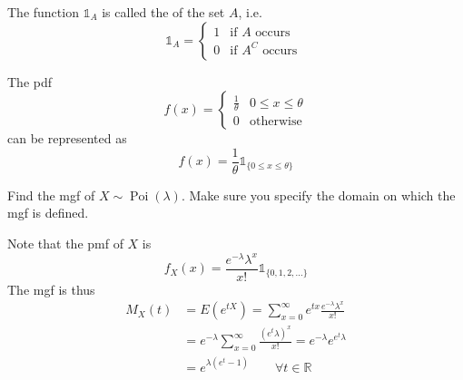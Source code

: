 \documentclass[notoc,notitlepage]{tufte-book}
\DeclareMathOperator{\Poi}{Poi }
\begin{document}
\begin{defn}
\label{defn:indicator_function}
  The function $\mathbb{1}_A$ is called the  of the set $A$, i.e.
  \begin{equation}\label{eq:indicator_function}
    \mathbb{1}_A = \begin{cases}
      1 & \text{if } A \text{ occurs } \\
      0 & \text{if } A^C \text{ occurs }
    \end{cases}
  \end{equation}
\end{defn}

\begin{eg}
  The pdf
  \begin{equation*}
    f(x) = \begin{cases}
      \frac{1}{\theta} & 0 \leq x \leq \theta \\
      0                & \text{otherwise}
    \end{cases}
  \end{equation*}
  can be represented as
  \begin{equation*}
    f(x) = \frac{1}{\theta} \mathbb{1}_{\{0 \leq x \leq \theta \}}
  \end{equation*}
\end{eg}

\begin{eg}[Example 2.26]
  Find the mgf of $X \sim \Poi(\lambda)$. Make sure you specify the domain on which the mgf is defined.

  \begin{solution}
    Note that the pmf of $X$ is
    \begin{equation*}
      f_X(x) = \frac{e^{-\lambda} \lambda^x}{x!} \mathbb{1}_{\{0, 1, 2, ...\}}
    \end{equation*}
    The mgf is thus
    \begin{align*}
      M_X(t) &= E(e^{tX}) = \sum_{x = 0}^{\infty} e^{tx} \frac{e^{-\lambda} \lambda^x}{x!} \\
             &= e^{-\lambda} \sum_{x = 0}^{\infty} \frac{(e^t \lambda)^x}{x!} = e^{-\lambda} e^{e^{t} \lambda} \\
             &= e^{\lambda( e^t - 1 )} \qquad \forall t \in \mathbb{R} 
    \end{align*}
  \end{solution}
\end{eg}
\end{document}
